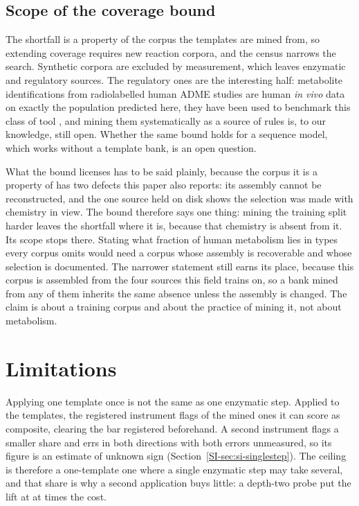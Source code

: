 \subsection{Scope of the coverage bound}
\label{sec:scope}

The shortfall is a property of the corpus the templates are mined from, so extending coverage
requires new reaction corpora, and the census narrows the search.
Synthetic corpora are excluded by measurement, which leaves enzymatic and regulatory sources. The
regulatory ones are the interesting half: metabolite identifications from radiolabelled human ADME
studies are human \emph{in vivo} data on exactly the population predicted here, they have been used
to benchmark this class of tool \citep{Gao_2026}, and mining them systematically as a source of
rules is, to our knowledge, still open. Whether the same bound holds for a sequence model, which
works without a template bank, is an open question.

What the bound licenses has to be said plainly, because the corpus it is a property of has two
defects this paper also reports: its assembly cannot be reconstructed, and the one source held on
disk shows the selection was made with chemistry in view. The bound therefore says one thing:
mining the training split harder leaves the shortfall where it is, because that chemistry is
absent from it. Its scope stops there. Stating what fraction of human metabolism lies in types
every corpus omits would need a corpus whose assembly is recoverable and whose selection is
documented.
The narrower statement still earns its place, because this corpus is assembled from the four
sources this field trains on, so a bank mined from any of them inherits the same absence unless the
assembly is changed. The claim is about a training corpus and about the practice of mining it, not
about metabolism.

\section{Limitations}
\label{sec:limitations}

Applying one template once is not the same as one enzymatic step. Applied to the templates, the registered instrument flags
\numCompositeEditsharePct{} of the mined ones it can score as composite, clearing the bar
registered beforehand. A second instrument flags a smaller share and errs in both directions with
both errors unmeasured, so its figure is an estimate of unknown sign
(Section~\ref{SI-sec:si-singlestep}). The ceiling is therefore a one-template one where a single
enzymatic step may take several, and that share is why a second application buys little: a
depth-two probe put the lift at \numDepthtwoLift{} at \numDepthtwoCost{} times the cost.

